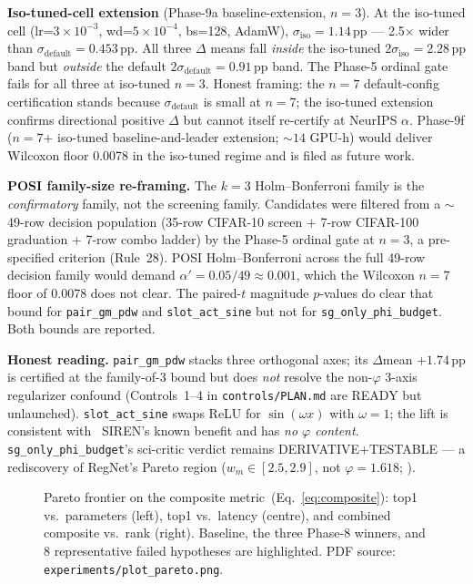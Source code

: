\documentclass{article}
\begin{document}
\textbf{Iso-tuned-cell extension} (Phase-9a baseline-extension,
$n{=}3$). At the iso-tuned cell (lr=$3{\times}10^{-3}$,
wd=$5{\times}10^{-4}$, bs=128, AdamW), $\sigma_{\mathrm{iso}}=1.14$\,pp
--- 2.5$\times$ wider than $\sigma_{\mathrm{default}}=0.453$\,pp. All
three $\Delta$ means fall \emph{inside} the iso-tuned
$2\sigma_{\mathrm{iso}}=2.28$\,pp band but \emph{outside} the default
$2\sigma_{\mathrm{default}}=0.91$\,pp band. The Phase-5 ordinal gate
fails for all three at iso-tuned $n{=}3$. Honest framing: the
$n{=}7$ default-config certification stands because
$\sigma_{\mathrm{default}}$ is small at $n{=}7$; the iso-tuned
extension confirms directional positive $\Delta$ but cannot itself
re-certify at NeurIPS $\alpha$. Phase-9f ($n{=}7$+ iso-tuned
baseline-and-leader extension; $\sim 14$ GPU-h) would deliver
Wilcoxon floor 0.0078 in the iso-tuned regime and is filed as future
work.

\textbf{POSI family-size re-framing.} The $k{=}3$ Holm--Bonferroni
family is the \emph{confirmatory} family, not the screening family.
Candidates were filtered from a $\sim$49-row decision population
(35-row CIFAR-10 screen + 7-row CIFAR-100 graduation + 7-row combo
ladder) by the Phase-5 ordinal gate at $n{=}3$, a pre-specified
criterion (Rule~28). POSI Holm--Bonferroni across the full 49-row
decision family would demand $\alpha' = 0.05/49 \approx 0.001$, which
the Wilcoxon $n{=}7$ floor of 0.0078 does not clear. The paired-$t$
magnitude $p$-values do clear that bound for \texttt{pair\_gm\_pdw}
and \texttt{slot\_act\_sine} but not for
\texttt{sg\_only\_phi\_budget}. Both bounds are reported.

\textbf{Honest reading.} \texttt{pair\_gm\_pdw} stacks three
orthogonal axes; its $\Delta$mean $+1.74$\,pp is certified at the
family-of-3 bound but does \emph{not} resolve the non-$\varphi$
3-axis regularizer confound (Controls~1--4 in
\texttt{controls/PLAN.md} are READY but unlaunched).
\texttt{slot\_act\_sine} swaps ReLU for $\sin(\omega x)$ with
$\omega{=}1$; the lift is consistent with~\citet{sitzmann2020siren}
SIREN's known benefit and has \emph{no $\varphi$ content}.
\texttt{sg\_only\_phi\_budget}'s sci-critic verdict remains
DERIVATIVE+TESTABLE --- a rediscovery of RegNet's Pareto region
($w_m \in [2.5, 2.9]$, not $\varphi=1.618$;
\citealp{radosavovic2020regnet}).

\begin{figure}[t]
  \centering
  \caption{Pareto frontier on the composite
  metric~(Eq.~\ref{eq:composite}): top1 vs.\ parameters (left),
  top1 vs.\ latency (centre), and combined composite vs.\ rank
  (right). Baseline, the three Phase-8 winners, and 8 representative
  failed hypotheses are highlighted. PDF source: \texttt{experiments/plot\_pareto.png}.}
  \label{fig:pareto}
\end{figure}
\end{document}
